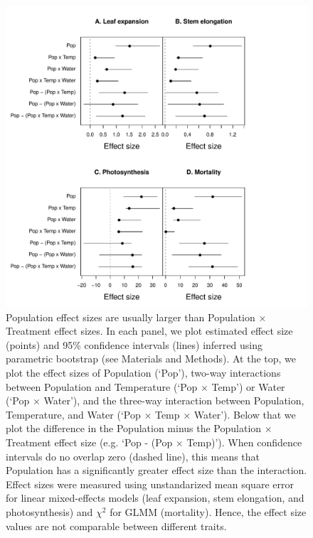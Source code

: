 \documentclass[11pt, oneside]{article}
\begin{document}
\begin{figure}
	\centerline{\includegraphics{Figures/FigureS_EffectSizes.pdf}}
	\fontsize{10}{12}
	\selectfont
	\caption[Effect sizes]{Population effect sizes are usually larger than Population $\times$ Treatment effect sizes. In each panel, we plot estimated effect size (points) and 95\% confidence intervals (lines) inferred using parametric bootstrap (see Materials and Methods). At the top, we plot the effect sizes of Population (`Pop'), two-way interactions between Population and Temperature (`Pop $\times$ Temp') or Water (`Pop $\times$ Water'), and the three-way interaction between Population, Temperature, and Water (`Pop $\times$ Temp $\times$ Water'). Below that we plot the difference in the Population minus the Population $\times$ Treatment effect size (e.g. `Pop - (Pop $\times$ Temp)'). When confidence intervals do no overlap zero (dashed line), this means that Population has a significantly greater effect size than the interaction. Effect sizes were measured using unstandarized mean square error for linear mixed-effects models (leaf expansion, stem elongation, and photosynthesis) and $\chi^2$ for GLMM (mortality). Hence, the effect size values are not comparable between different traits.}
	\label{fig:FigS_EffectSizes}
\end{figure}
\end{document}
